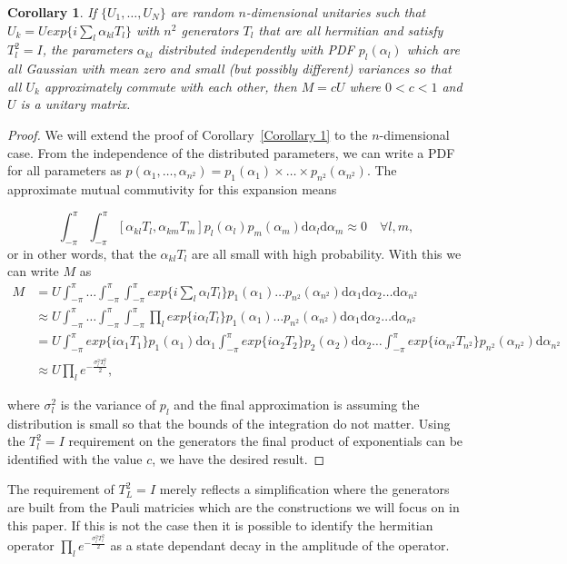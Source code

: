 \documentclass[aps,pra,twocolumn,superscriptaddress,numerical,floatfix]{revtex4-1}
\newtheorem{corollary}{Corollary}
\begin{document}
\begin{corollary}
\label{Corollary 2}
If $\{U_1,\ldots,U_N\}$ are random $n$-dimensional unitaries such that $U_k = U exp\{i \sum_l \alpha_{kl} T_l\}$ with $n^2$ generators $T_l$ that are all hermitian and satisfy $T_l^2=I$, the parameters $\alpha_{kl}$ distributed independently with PDF $p_{l}(\alpha_l)$ which are all Gaussian with mean zero and small (but possibly different) variances so that all $U_k$ approximately commute with each other, then $M = c U$ where $0 < c < 1$ and $U$ is a unitary matrix.
\end{corollary}
\begin{proof}
We will extend the proof of Corollary~\ref{Corollary 1} to the $n$-dimensional case.  From the independence of the distributed parameters, we can write a PDF for all parameters as $p(\alpha_1,\ldots,\alpha_{n^{2}}) = p_1(\alpha_1)\times\ldots\times p_{n^2}(\alpha_{n^{2}})$.    
The approximate mutual commutivity for this expansion means 
\begin{widetext}
\newcommand{\theint}{\int^\pi_{-\pi} \ldots \int^\pi_{-\pi} \int^\pi_{-\pi}}
\newcommand{\theintd}{\mathrm{d}\alpha_1 \mathrm{d}\alpha_2 \ldots \mathrm{d}\alpha_{n^{2}}}
\begin{equation}
	\int^\pi_{-\pi} \int^\pi_{-\pi}
	[\alpha_{kl}T_{l},\alpha_{km}T_{m}] p_l(\alpha_l)p_m(\alpha_m) \mathrm{d}\alpha_l \mathrm{d}\alpha_m \approx 0 \quad \forall l,m,
\end{equation}
or in other words, that the $\alpha_{kl}T_l$ are all small with high probability.  With this we can write $M$ as
\begin{align}
	M &= U \theint
	exp\{i \sum_l \alpha_{l} T_l\} p_1(\alpha_1)\ldots p_{n^2}(\alpha_{n^{2}})
	\theintd
	\label{eq:general integral form} \\
	&\approx U \theint
	\prod_{l}exp\{i \alpha_{l} T_l\}p_1(\alpha_1)\ldots p_{n^2}(\alpha_{n^{2}})
	\theintd  \\
	&= U\int^\pi_{-\pi} exp\{i \alpha_{1} T_1\}p_1(\alpha_1) \mathrm{d}\alpha_1 	\int^\pi_{-\pi} exp\{i \alpha_{2} T_2\}p_2(\alpha_2) \mathrm{d}\alpha_2 \ldots \int^\pi_{-\pi}
	exp\{i \alpha_{n^2} T_{n^2}\}p_{n^2}(\alpha_{n^2}) \mathrm{d}\alpha_{n^2} \\
	&\approx U \prod_l e^{-\frac{\sigma_l^2 T_l^2}{2}},\label{eq:approx commuting, general case}
\end{align}
\end{widetext}
where $\sigma_l^2$ is the variance of $p_l$ and the final approximation is assuming the distribution is small so that the bounds of the integration do not matter.  Using the $T_l^2=I$ requirement on the generators the final product of exponentials can be identified with the value $c$, we have the desired result.
\end{proof}
The requirement of $T_L^2=I$ merely reflects a simplification where the generators are built from the Pauli matricies which are the constructions we will focus on in this paper.  If this is not the case then it is possible to identify the hermitian operator $\prod_l e^{-\frac{\sigma_l^2 T_l^2}{2}}$ as a state dependant decay in the amplitude of the operator.
\end{document}
